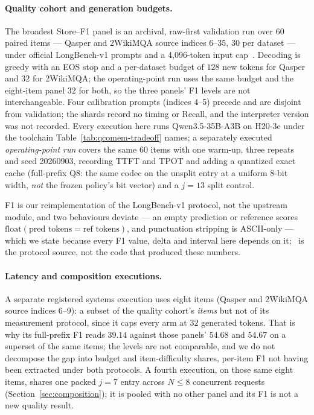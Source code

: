 \documentclass{article}
\begin{document}
\paragraph{Quality cohort and generation budgets.}
The broadest Store--F1 panel is an archival, raw-first validation run over 60
paired items --- Qasper and 2WikiMQA source indices 6--35, 30 per dataset ---
under official LongBench-v1 prompts and a 4,096-token input
cap~\citep{bai2024longbench,dasigi2021qasper,ho2020multihopqa}.  Decoding is
greedy with an EOS stop and a per-dataset budget of $128$ new tokens for Qasper
and $32$ for 2WikiMQA; the operating-point run uses the same budget and the
eight-item panel $32$ for both, so the three panels' F1 levels are not
interchangeable.  Four calibration prompts (indices 4--5) precede and are
disjoint from validation; the shards record no timing or Recall, and the
interpreter version was not recorded.  Every execution here runs
Qwen3.5-35B-A3B on H20-3e under the toolchain Table~\ref{tab:qcomem-tradeoff}
names; a separately executed \emph{operating-point run} covers the same 60
items with one warm-up, three repeats and seed 20260903, recording TTFT and TPOT
and adding a quantized exact cache (full-prefix Q8: the same codec on the
unsplit entry at a uniform 8-bit width, \emph{not} the frozen policy's bit
vector) and a $j=13$ split control.

F1 is our reimplementation of the LongBench-v1  protocol, not
the upstream module, and two behaviours deviate --- an empty prediction or
reference scores $\mathrm{float}(\text{pred tokens}=\text{ref tokens})$, and
punctuation stripping is ASCII-only --- which we state because every F1 value,
delta and interval here depends on it;~\citep{bai2024longbenchcode} is the
protocol source, not the code that produced these numbers.

\paragraph{Latency and composition executions.}
A separate registered systems execution uses eight items (Qasper and 2WikiMQA
source indices 6--9): a subset of the quality cohort's \emph{items} but not of
its measurement protocol, since it caps every arm at $32$ generated tokens.
That is why its full-prefix F1 reads $39.14$ against those panels' $54.68$ and
$54.67$ on a superset of the same items; the levels are not comparable, and we
do not decompose the gap into budget and item-difficulty shares, per-item F1 not
having been extracted under both protocols.  A fourth execution, on those same
eight items, shares one packed $j=7$ entry across $N\leq8$ concurrent requests
(Section~\ref{sec:composition}); it is pooled with no other panel and its F1 is
not a new quality result.
\end{document}
